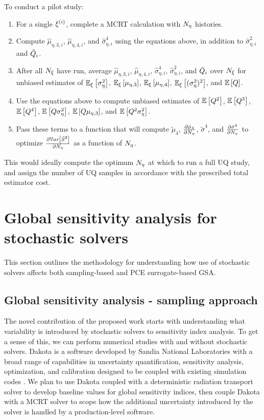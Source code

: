 To conduct a pilot study:
\begin{enumerate}
    \item For a single $\xi^{(i)}$, complete a MCRT calculation with ${N_\eta}$ histories.
    \item Compute $\hat{\mu}_{\eta,3,i}$, $\hat{\mu}_{\eta,4,i}$, and $\hat{\sigma}_{\eta,i}^4$ using the equations above, in addition to $\hat{\sigma}_{\eta,i}^2$ and $\tilde{Q}_i$.
    \item After all ${N_\xi}$ have run, average $\hat{\mu}_{\eta,3,i}$, $\hat{\mu}_{\eta,4,i}$, $\hat{\sigma}_{\eta,i}^4$, $\hat{\sigma}_{\eta,i}^2$, and $\tilde{Q}_i$ over ${N_\xi}$ for unbiased estimates of $\mathbb{E}_\xi\left[\sigma^2_\eta\right]$, $\mathbb{E}_\xi\left[\mu_{\eta,3}\right]$, $\mathbb{E}_\xi\left[\mu_{\eta,4}\right]$, $\mathbb{E}_\xi\left[(\sigma^2_\eta)^2\right]$, and $\mathbb{E}\left[Q\right]$.
    \item Use the equations above to compute unbiased estimates of $\mathbb{E}\left[Q^2\right]$, $\mathbb{E}\left[Q^3\right]$, $\mathbb{E}\left[Q^4\right]$, $\mathbb{E}\left[Q\sigma^2_\eta\right]$, $\mathbb{E}\left[Q\mu_{\eta,3}\right]$, and $\mathbb{E}\left[Q^2\sigma^2_\eta\right]$.
    \item Pass these terms to a function that will compute $\tilde{\mu}_4$, $\frac{ \partial  \tilde{\mu}_4  }{ \partial  {N_\eta}  }$, $\tilde{\sigma}^4$, and $\frac{ \partial \tilde{\sigma}^4 }{ \partial {N_\eta} }$ to optimize $\frac{ \partial  \mathbb{V}ar\left[\tilde{S}^2\right]  }{ \partial  {N_\eta}  }$ as a function of ${N_\eta}$.
\end{enumerate}
This would ideally compute the optimum ${N_\eta}$ at which to run a full UQ study, and assign the number of UQ samples in accordance with the prescribed total estimator cost. 



\section{Global sensitivity analysis for stochastic solvers}
This section outlines the methodology for understanding how use of stochastic solvers affects both sampling-based and PCE surrogate-based GSA.

\subsection{Global sensitivity analysis - sampling approach}
The novel contribution of the proposed work starts with understanding what variability is introduced by stochastic solvers to sensitivity index analysis. To get a sense of this, we can perform numerical studies with and without stochastic solvers. Dakota is a software developed by Sandia National Laboratories with a broad range of capabilities in uncertainty quantification, sensitivity analysis, optimization, and calibration designed to be coupled with existing simulation codes \cite{dakota}. We plan to use Dakota coupled with a deterministic radiation transport solver to develop baseline values for global sensitivity indices, then couple Dakota with a MCRT solver to scope how the additional uncertainty introduced by the solver is handled by a production-level software. 

